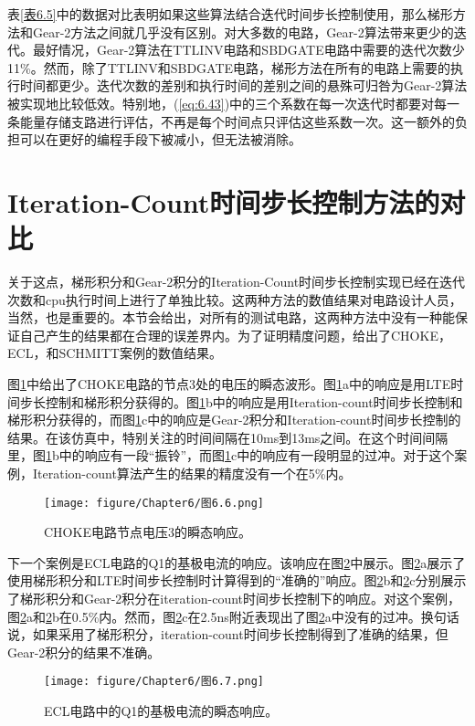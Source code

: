 表\ref{表6.5}中的数据对比表明如果这些算法结合迭代时间步长控制使用，那么梯形方法和Gear-2方法之间就几乎没有区别。对大多数的电路，Gear-2算法带来更少的迭代。最好情况，Gear-2算法在TTLINV电路和SBDGATE电路中需要的迭代次数少11\%。然而，除了TTLINV和SBDGATE电路，梯形方法在所有的电路上需要的执行时间都更少。迭代次数的差别和执行时间的差别之间的悬殊可归咎为Gear-2算法被实现地比较低效。特别地，(\ref{eq:6.43})中的三个系数在每一次迭代时都要对每一条能量存储支路进行评估，不再是每个时间点只评估这些系数一次。这一额外的负担可以在更好的编程手段下被减小，但无法被消除。

\section{Iteration-Count时间步长控制方法的对比}
关于这点，梯形积分和Gear-2积分的Iteration-Count时间步长控制实现已经在迭代次数和cpu执行时间上进行了单独比较。这两种方法的数值结果对电路设计人员，当然，也是重要的。本节会给出，对所有的测试电路，这两种方法中没有一种能保证自己产生的结果都在合理的误差界内。为了证明精度问题，给出了CHOKE，ECL，和SCHMITT案例的数值结果。

图\ref{图6.6}中给出了CHOKE电路的节点3处的电压的瞬态波形。图\ref{图6.6}a中的响应是用LTE时间步长控制和梯形积分获得的。图\ref{图6.6}b中的响应是用Iteration-count时间步长控制和梯形积分获得的，而图\ref{图6.6}c中的响应是Gear-2积分和Iteration-count时间步长控制的结果。在该仿真中，特别关注的时间间隔在10ms到13ms之间。在这个时间间隔里，图\ref{图6.6}b中的响应有一段“振铃”，而图\ref{图6.6}c中的响应有一段明显的过冲。对于这个案例，Iteration-count算法产生的结果的精度没有一个在5\%内。

\begin{figure}[htbp]
\small
    \centering
    \texttt{[image: figure/Chapter6/图6.6.png]}
    \caption{CHOKE电路节点电压3的瞬态响应。}
    \label{图6.6}
\end{figure}

下一个案例是ECL电路的Q1的基极电流的响应。该响应在图\ref{图6.7}中展示。图\ref{图6.7}a展示了使用梯形积分和LTE时间步长控制时计算得到的“准确的”响应。图\ref{图6.7}b和\ref{图6.7}c分别展示了梯形积分和Gear-2积分在iteration-count时间步长控制下的响应。对这个案例，图\ref{图6.7}a和\ref{图6.7}b在0.5\%内。然而，图\ref{图6.7}c在2.5ns附近表现出了图\ref{图6.7}a中没有的过冲。换句话说，如果采用了梯形积分，iteration-count时间步长控制得到了准确的结果，但Gear-2积分的结果不准确。
\begin{figure}[htbp]
\small
    \centering
    \texttt{[image: figure/Chapter6/图6.7.png]}
    \caption{ECL电路中的Q1的基极电流的瞬态响应。}
    \label{图6.7}
\end{figure}

